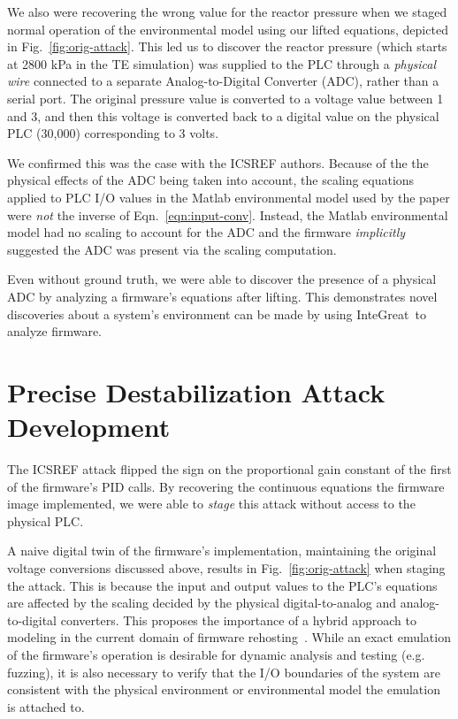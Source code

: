 We also were recovering the wrong value for the reactor pressure when we staged normal operation of the environmental model using our lifted equations, depicted in Fig.~\ref{fig:orig-attack}.
This led us to discover the reactor pressure (which starts at 2800 kPa in the TE simulation) was supplied to the PLC through a \emph{physical wire} connected to a separate Analog-to-Digital Converter (ADC), rather than a serial port.
The original pressure value is converted to a voltage value between 1 and 3, and then this voltage is converted back to a digital value on the physical PLC (30,000) corresponding to 3 volts.

We confirmed this was the case with the ICSREF authors.
Because of the the physical effects of the ADC being taken into account, the scaling equations applied to PLC I/O values in the Matlab environmental model used by the paper were \emph{not} the inverse of Eqn.~\ref{eqn:input-conv}.
Instead, the Matlab environmental model had no scaling to account for the ADC and the firmware \emph{implicitly} suggested the ADC was present via the scaling computation.

Even without ground truth, we were able to discover the presence of a physical ADC by analyzing a firmware's equations after lifting.
This demonstrates novel discoveries about a system's environment can be made by using InteGreat\ to analyze firmware.

\section{Precise Destabilization Attack Development}
The ICSREF attack flipped the sign on the proportional gain constant of the first of the firmware's PID calls.
By recovering the continuous equations the firmware image implemented, we were able to \emph{stage} this attack without access to the physical PLC.

A naive digital twin of the firmware's implementation, maintaining the original voltage conversions discussed above, results in Fig.~\ref{fig:orig-attack} when staging the attack.
This is because  the input and output values to the PLC's equations are affected by the scaling decided by the physical digital-to-analog and analog-to-digital converters.
This proposes the importance of a hybrid approach to modeling in the current domain of firmware rehosting~\cite{jetset,p2im,halucinator}.
While an exact emulation of the firmware's operation is desirable for dynamic analysis and testing (e.g. fuzzing), it is also necessary to verify that the I/O boundaries of the system are consistent with the physical environment or environmental model the emulation is attached to.


